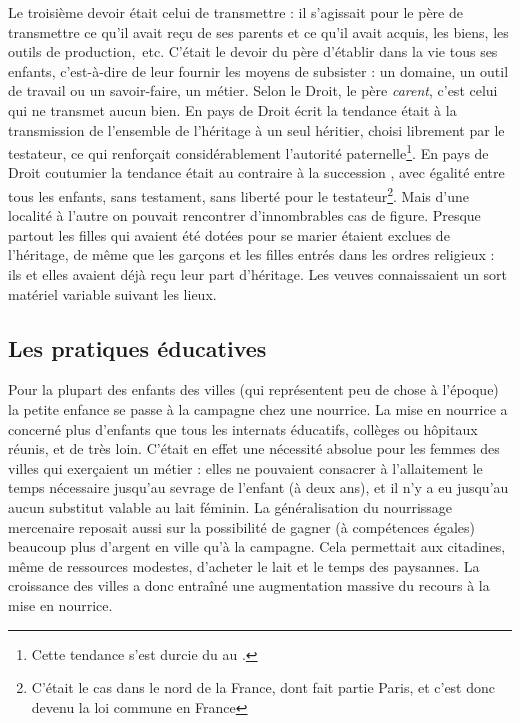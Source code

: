 Le troisième devoir était celui de 
transmettre : il s'agissait pour le père de transmettre ce qu'il avait reçu de ses parents et ce qu'il avait acquis, les biens, les outils de production,~etc. C'était le devoir du père d'établir dans la vie tous ses enfants, c'est-à-dire de leur fournir les moyens de subsister : un domaine, un outil de travail ou un savoir-faire, un métier. Selon le Droit, le père \emph{carent}, c'est celui qui ne transmet aucun bien. En pays de Droit écrit la tendance était à la transmission de l'ensemble de l'héritage à un seul héritier, choisi librement par le testateur, ce qui renforçait considérablement l'autorité paternelle\footnote{Cette tendance s'est durcie du  au .}. En pays de Droit coutumier la tendance était au contraire à la succession , avec égalité entre tous les enfants, sans testament, sans liberté pour le testateur\footnote{C'était le cas dans le nord de la France, dont fait partie Paris, et c'est donc devenu la loi commune en France}. Mais d'une localité à l'autre  on pouvait rencontrer d'innombrables cas de figure. Presque partout les filles qui avaient été dotées pour se marier étaient exclues de l'héritage, de même que les garçons et les filles entrés dans les ordres religieux : ils et elles avaient déjà reçu leur part d'héritage. Les veuves connaissaient un sort matériel variable suivant les lieux. 


\subsection{Les pratiques éducatives}

 Pour la plupart des enfants des villes (qui représentent peu de chose à l'époque) la petite enfance se passe à la campagne chez une nourrice. La mise en nourrice a concerné plus d'enfants que tous les internats éducatifs, collèges ou hôpitaux réunis, et de très loin. C'était en effet une nécessité absolue pour les femmes des villes qui exerçaient un métier : elles ne pouvaient consacrer à l'allaitement le temps nécessaire jusqu'au sevrage de l'enfant (à deux ans), et il n'y a eu jusqu'au  aucun substitut valable au lait féminin. La généralisation du nourrissage mercenaire reposait aussi sur la possibilité de gagner (à compétences égales) beaucoup plus d'argent en ville qu'à la campagne. Cela permettait aux citadines, même de ressources modestes, d'acheter le lait et le temps des paysannes. La croissance des villes a donc entraîné une augmentation massive du recours à la mise en nourrice.

